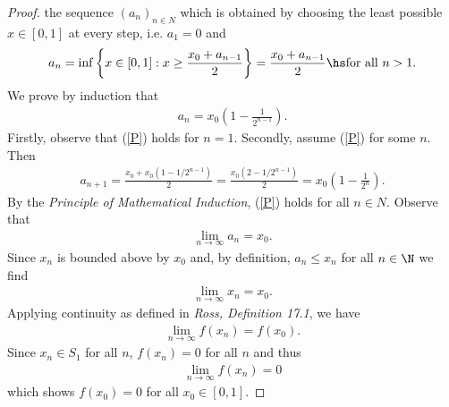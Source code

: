 \documentclass{article}
\begin{document}
\begin{proof}
    the sequence $(a_n)_{n\in N}$ which is obtained by choosing the least possible
    $x\in[0,1]$ at every step, i.e. $a_1=0$ and
    \begin{align*}
        a_n = \inf\left\lbrace x\in [0,1] : x \geq \frac{x_0+a_{n-1}}{2}\right\rbrace = \frac{x_0+a_{n-1}}{2}
        \hs\text{for all }n>1.
    \end{align*}
    We prove by induction that
    \begin{align}
        \label{P}
        a_n = x_0 \left(1-\frac{1}{2^{n-1}}\right).
    \end{align}
    Firstly, observe that (\ref{P}) holds for $n=1$. Secondly, assume (\ref{P}) for
    some $n$. Then
    \begin{align*}
        a_{n+1} = \frac{x_0 + x_0(1-1/2^{n-1})}{2} 
        = \frac{x_0(2-1/2^{n-1})}{2} = x_0\left(1-\frac{1}{2^n}\right).
    \end{align*}
    By the \emph{Principle of Mathematical Induction}, (\ref{P}) holds for all $n\in N$.
    Observe that
    \begin{align*}
        \lim_{n\to\infty}a_n = x_0.
    \end{align*}
    Since $x_n$ is bounded above by $x_0$ and, by definition, $a_n\leq x_n$ for all $n\in\N$
    we find
    \begin{align*}
        \lim_{n\to\infty}x_n = x_0.
    \end{align*}
    Applying continuity as defined in \emph{Ross, Definition 17.1}, we have
    \begin{align*}
        \lim_{n\to\infty} f(x_n) = f(x_0).
    \end{align*}
    Since $x_n\in S_1$ for all $n$, $f(x_n)=0$ for all $n$ and thus
    \begin{align*}
        \lim_{n\to\infty} f(x_n) = 0
    \end{align*}
    which shows $f(x_0)=0$ for all $x_0\in[0,1]$.
\end{proof}
\end{document}
